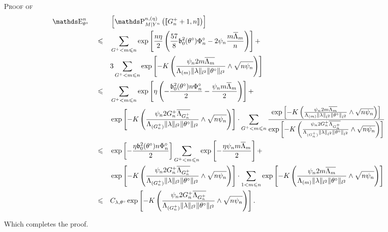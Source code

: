 \begin{pro}{\textsc{Proof of } \\}
\begin{alignat*}{3}
& \E_{\theta^{\circ}}^{n}&& &&\left[\P_{M \vert Y^{n}}^{n, (\eta)}\left(\llbracket G^{+}_{n} + 1, n \rrbracket\right)\right]\\
& && \leq && \sum\limits_{G^{+} < m \leq n}\exp\left[\frac{n \eta}{2}\left(\frac{57}{8} \mathfrak{b}_{0}^{2}(\theta^{\circ}) \Phi^{\circ}_{n} - 2 \psi_{n} \frac{m \overline{\Lambda}_{m}}{n}\right)\right] +\notag\\
& && && 3 \sum\limits_{G^{+} < m \leq n} \exp\left[ -K \left(\frac{\psi_{n} 2 m\overline{\Lambda_{m}}}{\Lambda_{(m)} \Vert \lambda \Vert_{l^{2}} \Vert \theta^{\circ} \Vert_{l^{2}}} \wedge \sqrt{n \psi_{n}} \right)\right]\\
& && \leq && \sum\limits_{G^{+} < m \leq n} \exp\left[\eta\left(-\frac{\mathfrak{b}_{0}^{2}(\theta^{\circ}) n \Phi^{\circ}_{n}}{2} - \frac{\psi_{n} m \overline{\Lambda}_{m}}{2}\right)\right] +\notag\\
& && && \exp\left[ -K \left(\frac{\psi_{n} 2 G^{+}_{n} \overline{\Lambda_{G^{+}_{n}}}}{\Lambda_{(G^{+}_{n})} \Vert \lambda \Vert_{l^{2}} \Vert \theta^{\circ} \Vert_{l^{2}}} \wedge \sqrt{n \psi_{n}} \right)\right]\cdot \sum\limits_{G^{+} < m \leq n} \frac{\exp\left[ -K \left(\frac{\psi_{n} 2 m\overline{\Lambda_{m}}}{\Lambda_{(m)} \Vert \lambda \Vert_{l^{2}} \Vert \theta^{\circ} \Vert_{l^{2}}} \wedge \sqrt{n \psi_{n}} \right)\right]}{\exp\left[ -K \left(\frac{\psi_{n} 2 G^{+}_{n} \overline{\Lambda_{G^{+}_{n}}}}{\Lambda_{(G^{+}_{n})} \Vert \lambda \Vert_{l^{2}} \Vert \theta^{\circ} \Vert_{l^{2}}} \wedge \sqrt{n \psi_{n}} \right)\right]}\\
& && \leq && \exp\left[-\frac{\eta \mathfrak{b}_{0}^{2}(\theta^{\circ}) n \Phi^{\circ}_{n}}{2}\right]\sum\limits_{G^{+} < m \leq n} \exp\left[- \frac{\eta \psi_{n} m \overline{\Lambda}_{m}}{2}\right] +\\
& && && \exp\left[ -K \left(\frac{\psi_{n} 2 G^{+}_{n} \overline{\Lambda_{G^{+}_{n}}}}{\Lambda_{(G^{+}_{n})} \Vert \lambda \Vert_{l^{2}} \Vert \theta^{\circ} \Vert_{l^{2}}} \wedge \sqrt{n \psi_{n}} \right)\right]\cdot \sum\limits_{1 < m \leq n} \exp\left[ -K \left(\frac{\psi_{n} 2 m\overline{\Lambda_{m}}}{\Lambda_{(m)} \Vert \lambda \Vert_{l^{2}} \Vert \theta^{\circ} \Vert_{l^{2}}} \wedge \sqrt{n \psi_{n}} \right)\right]\\
& && \leq &&  C_{\lambda, \theta^{\circ}} \exp\left[ -K \left(\frac{\psi_{n} 2 G^{+}_{n} \overline{\Lambda_{G^{+}_{n}}}}{\Lambda_{(G^{+}_{n})} \Vert \lambda \Vert_{l^{2}} \Vert \theta^{\circ} \Vert_{l^{2}}} \wedge \sqrt{n \psi_{n}} \right)\right].
\end{alignat*}

Which completes the proof.

\qedsymbol
\end{pro}

